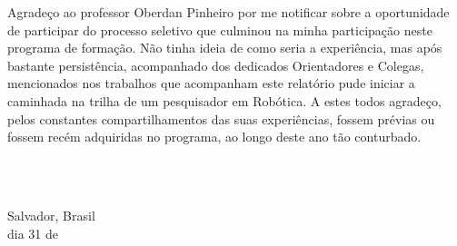 \begin{agradecimentos}

Agradeço ao professor Oberdan Pinheiro por me notificar sobre a oportunidade de participar do processo seletivo que culminou na minha participação neste programa de formação. Não tinha ideia de como seria a experiência, mas após bastante persistência, acompanhado dos dedicados Orientadores e Colegas, mencionados nos trabalhos que acompanham este relatório pude iniciar a caminhada na trilha de um pesquisador em Robótica. A estes todos agradeço, pelos constantes compartilhamentos das suas experiências, fossem prévias ou fossem recém adquiridas no programa, ao longo deste ano tão conturbado.





\ \\
\ \\

\noindent

\raggedright
Salvador, Brasil \\ 
dia 31 de \mesdeano \\

\raggedleft
\theauthor\\

\end{agradecimentos}
